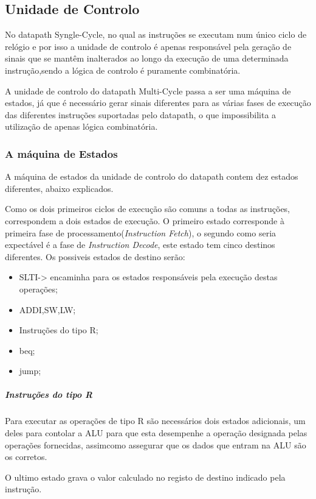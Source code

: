 \documentclass[10pt,a4paper]{book}
\begin{document}
		\subsection{Unidade de Controlo}

		No datapath Syngle-Cycle, no qual as instruções se executam num único ciclo de relógio e por isso
		a unidade de controlo é apenas responsável pela  geração de sinais que se mantêm inalterados ao
		longo da execução de uma determinada instrução,sendo a lógica de controlo é puramente combinatória.

		A unidade de controlo do datapath Multi-Cycle passa a ser uma máquina de estados, já que é necessário gerar sinais diferentes
		para as várias fases de execução das diferentes instruções suportadas pelo datapath,
		o que impossibilita a utilização de apenas lógica combinatória.

	  \subsubsection{A máquina de Estados}
		A máquina de estados da unidade de controlo do datapath contem dez estados diferentes, abaixo explicados.



		Como os dois primeiros ciclos de execução são comuns a todas as instruções, correspondem a dois estados de execução.
		O primeiro estado corresponde à primeira fase de processamento(\textit{Instruction Fetch}), o segundo como seria expectável é a fase de \textit{Instruction Decode}, este estado tem cinco destinos diferentes.
		Os possiveis estados de destino serão:
		\begin{itemize}
			\item SLTI-> encaminha para os estados responsáveis pela execução destas operações;
			\item ADDI,SW,LW;
			\item Instruções do tipo R;
			\item beq;
			\item jump;
		\end{itemize}


			\subparagraph{Instruções do tipo R}
			 	Para executar as operações de tipo R são necessários dois estados adicionais, um deles para contolar a ALU para que esta desempenhe a operação designada pelas operações fornecidas, assimcomo assegurar que os dados que entram na ALU são os corretos.

				O ultimo estado  grava o valor calculado no registo de destino indicado pela instrução.
\end{document}
